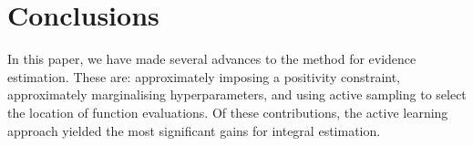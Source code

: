 \documentclass{article} %
\begin{document}
\section{Conclusions}

 In this paper, we have made several advances to the  method for evidence estimation.  These are: approximately imposing a positivity constraint, approximately marginalising hyperparameters, and using active sampling to select the location of function evaluations. Of these contributions, the active learning approach yielded the most significant gains for integral estimation.
 
 










\pagebreak


%
%
\end{document}
